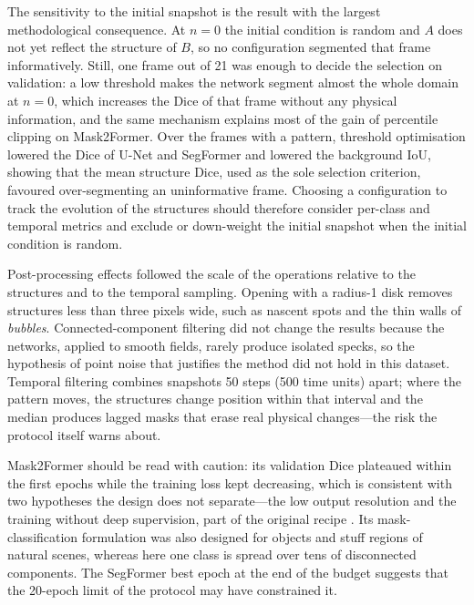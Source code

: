 \documentclass[preprint,12pt,authoryear]{elsarticle}
\begin{document}
The sensitivity to the initial snapshot is the result with the largest methodological consequence. At $n=0$ the initial condition is random and $A$ does not yet reflect the structure of $B$, so no configuration segmented that frame informatively. Still, one frame out of 21 was enough to decide the selection on validation: a low threshold makes the network segment almost the whole domain at $n=0$, which increases the Dice of that frame without any physical information, and the same mechanism explains most of the gain of percentile clipping on Mask2Former. Over the frames with a pattern, threshold optimisation lowered the Dice of U-Net and SegFormer and lowered the background IoU, showing that the mean structure Dice, used as the sole selection criterion, favoured over-segmenting an uninformative frame. Choosing a configuration to track the evolution of the structures should therefore consider per-class and temporal metrics and exclude or down-weight the initial snapshot when the initial condition is random.

Post-processing effects followed the scale of the operations relative to the structures and to the temporal sampling. Opening with a radius-1 disk removes structures less than three pixels wide, such as nascent spots and the thin walls of \emph{bubbles}. Connected-component filtering did not change the results because the networks, applied to smooth fields, rarely produce isolated specks, so the hypothesis of point noise that justifies the method did not hold in this dataset. Temporal filtering combines snapshots 50 steps (500 time units) apart; where the pattern moves, the structures change position within that interval and the median produces lagged masks that erase real physical changes---the risk the protocol itself warns about.

Mask2Former should be read with caution: its validation Dice plateaued within the first epochs while the training loss kept decreasing, which is consistent with two hypotheses the design does not separate---the low output resolution and the training without deep supervision, part of the original recipe \citep{cheng2022mask2former}. Its mask-classification formulation was also designed for objects and stuff regions of natural scenes, whereas here one class is spread over tens of disconnected components. The SegFormer best epoch at the end of the budget suggests that the 20-epoch limit of the protocol may have constrained it.
\end{document}
